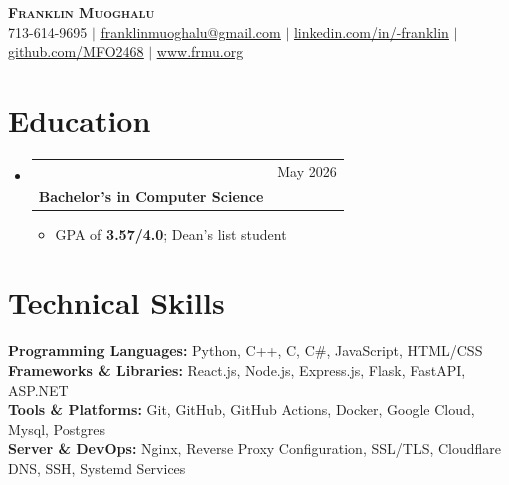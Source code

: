 \documentclass[letterpaper,11pt]{article}
\makeatletter
\newcommand{\resumeItem}[1]{
  \item\small{
    {#1 \vspace{-2pt}}
  }
}
\newcommand{\resumeSubheading}[4]{
  \vspace{-2pt}\item
    \begin{tabular*}{0.97\textwidth}[t]{l@{\extracolsep{\fill}}r}
      \text{#1} & #2 \\
      \textbf{\small#3} & \textbf{\small #4} \\
    \end{tabular*}\vspace{-7pt}
}
\newcommand{\resumeSubHeadingListStart}{\begin{itemize}[leftmargin=0.05in, label={}]}
\newcommand{\resumeSubHeadingListEnd}{\end{itemize}}
\newcommand{\resumeItemListStart}{\begin{itemize}}
\newcommand{\resumeItemListEnd}{\end{itemize}\vspace{-6pt}}
\makeatother
\begin{document}

\begin{center}
  \textbf{\Huge \scshape Franklin Muoghalu} \\ \vspace{1pt}
  \small 713-614-9695 $|$ \href{mailto:franklinmuoghalu@gmail.com}{\underline{franklinmuoghalu@gmail.com}} $|$
  \href{https://www.linkedin.com/in/onyekachukwu-muoghalu-a059aa217/}{\underline{linkedin.com/in/-franklin}} $|$
  \href{https://github.com/MFO246810}{\underline{github.com/MFO2468}} $|$
  \href{https://www.frmu.org/}{\underline{www.frmu.org}}
\end{center}


\section{Education}
\resumeSubHeadingListStart
\resumeSubheading
{University of Houston}{May 2026}
{Bachelor's in Computer Science}{}
\resumeItemListStart
\resumeItem{GPA of \textbf{3.57/4.0}; Dean's list student}
\resumeItemListEnd
\resumeSubHeadingListEnd \vspace{-18pt}

\section{Technical Skills}
\begin{itemize}[leftmargin=0.10in, label={}]
  \small{\item{
        \textbf{Programming Languages:} Python, C++, C, C\#, JavaScript, HTML/CSS \\
        \textbf{Frameworks \& Libraries:} React.js, Node.js, Express.js, Flask, FastAPI, ASP.NET\\
        \textbf{Tools \& Platforms:} Git, GitHub, GitHub Actions, Docker, Google Cloud, Mysql, Postgres\\
        \textbf{Server \& DevOps:} Nginx, Reverse Proxy Configuration, SSL/TLS, Cloudflare DNS, SSH, Systemd Services \\
        }}
\end{itemize}
\vspace{-20pt}
\end{document}
